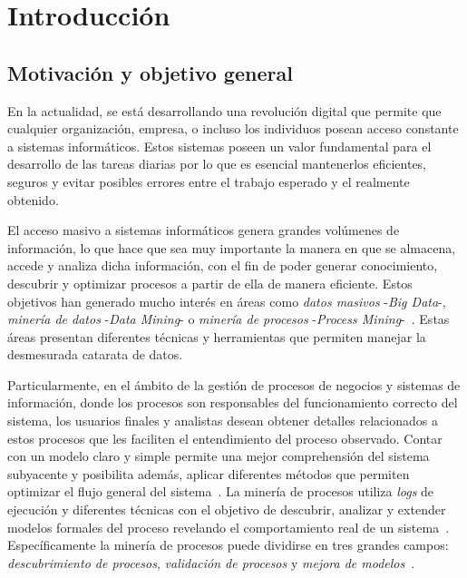 \chapter{Introducción}
\label{chap:1}

\section{Motivación y objetivo general}
\label{sec:mot}

En la actualidad, se está desarrollando una revolución digital que permite que cualquier organización, empresa,
o incluso los individuos posean acceso constante a sistemas informáticos. Estos sistemas poseen un valor fundamental
para el desarrollo de las tareas diarias por lo que es esencial mantenerlos eficientes, seguros y evitar posibles
errores entre el trabajo esperado y el realmente obtenido.

El acceso masivo a sistemas informáticos genera grandes volúmenes de información, lo que hace que sea muy importante
la manera en que se almacena, accede y analiza dicha información, con el fin de poder generar conocimiento,
descubrir y optimizar procesos a partir de ella de manera eficiente. 
Estos objetivos han generado mucho interés en áreas como \textit{datos masivos} -\textit{Big Data}-,
\textit{minería de datos} -\textit{Data Mining}- o \textit{minería de procesos} -\textit{Process Mining}-~\cite{Rozi07,AalstBook}.
Estas áreas presentan diferentes técnicas y herramientas que permiten manejar la desmesurada catarata de datos.

Particularmente, en el ámbito de la gestión de procesos de negocios y sistemas de información, donde los procesos son 
responsables del funcionamiento correcto del sistema, los usuarios finales y analistas desean obtener
detalles relacionados a estos procesos que les faciliten el entendimiento del proceso observado.
Contar con un modelo claro y simple permite una mejor comprehensión del sistema 
subyacente y posibilita además, aplicar diferentes métodos que permiten optimizar
el flujo general del sistema~\cite{Aalst2012}.
La minería de procesos utiliza \textit{logs} de ejecución y diferentes técnicas con el objetivo de descubrir,
analizar y extender modelos formales del proceso revelando el comportamiento real de un sistema~\cite{AalstBook}.
Específicamente la minería de procesos puede dividirse en tres grandes campos: \textit{descubrimiento de procesos},
\textit{validación de procesos} y \textit{mejora de modelos}~\cite{Aalst2004,AalstBook,FahlandA15}.

